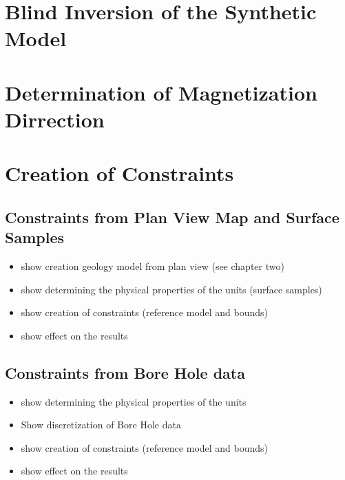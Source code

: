 
\section{Blind Inversion of the Synthetic Model}
\label{sec:Blind Inversion of the Synthetic Mode1:ElPoma}


\section{Determination of Magnetization Dirrection}
\label{sec:Determination of Magnetization Dirrection}

%
%


\section{Creation of Constraints }
\label{sec:Creation of Constraints:ElPoma}

\subsection{Constraints from Plan View Map and Surface Samples}
\label{sec:planViewElPoma}

\begin{itemize}
\item show creation  geology model from plan view (see chapter two)
\item show determining the physical properties of the units (surface samples)
\item show creation of constraints (reference model and bounds)
\item show effect on the results
\end{itemize}

\subsection{Constraints from Bore Hole data}
\label{sec:BHElPoma}

\begin{itemize}
\item show determining the physical properties of the units
\item Show discretization of Bore Hole data
\item show creation of constraints (reference model and bounds)
\item show effect on the results
\end{itemize}
%
%

